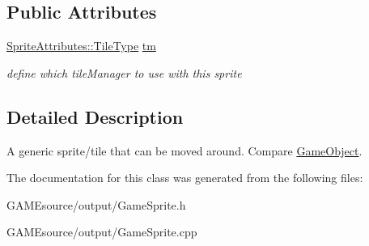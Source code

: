 \subsection*{Public Attributes}
\begin{DoxyCompactItemize}
\item 
\mbox{\label{class_game_sprite_a8cba19cb70bb128532903b320a0065c9}} 
\mbox{\hyperlink{namespace_sprite_attributes_a254503d1929a87fa82146c9b7d19c2df}{Sprite\+Attributes\+::\+Tile\+Type}} \mbox{\hyperlink{class_game_sprite_a8cba19cb70bb128532903b320a0065c9}{tm}}
\begin{DoxyCompactList}\small\item\em define which tile\+Manager to use with this sprite \end{DoxyCompactList}\end{DoxyCompactItemize}


\subsection{Detailed Description}
A generic sprite/tile that can be moved around. Compare \mbox{\hyperlink{class_game_object}{Game\+Object}}. 

The documentation for this class was generated from the following files\+:\begin{DoxyCompactItemize}
\item 
G\+A\+M\+Esource/output/Game\+Sprite.\+h\item 
G\+A\+M\+Esource/output/Game\+Sprite.\+cpp\end{DoxyCompactItemize}
